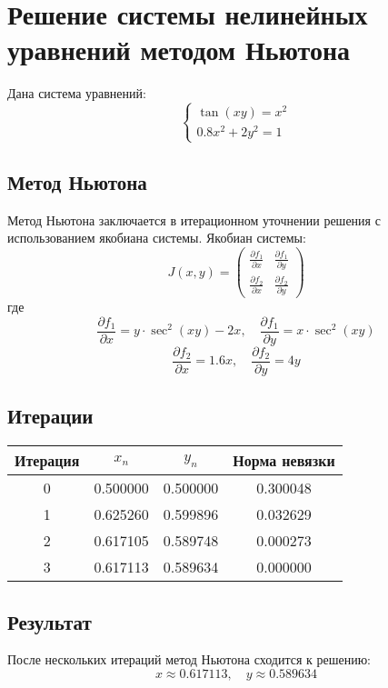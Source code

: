 \documentclass{article}
\begin{document}
\section*{Решение системы нелинейных уравнений методом Ньютона}

Дана система уравнений:
\[
\begin{cases}
\tan(xy) = x^2 \\
0.8x^2 + 2y^2 = 1
\end{cases}
\]

\subsection*{Метод Ньютона}

Метод Ньютона заключается в итерационном уточнении решения с использованием якобиана системы. Якобиан системы:
\[
J(x, y) = \begin{pmatrix}
\frac{\partial f_1}{\partial x} & \frac{\partial f_1}{\partial y} \\
\frac{\partial f_2}{\partial x} & \frac{\partial f_2}{\partial y}
\end{pmatrix}
\]
где
\[
\frac{\partial f_1}{\partial x} = y \cdot \sec^2(xy) - 2x, \quad
\frac{\partial f_1}{\partial y} = x \cdot \sec^2(xy)
\]
\[
\frac{\partial f_2}{\partial x} = 1.6x, \quad
\frac{\partial f_2}{\partial y} = 4y
\]

\subsection*{Итерации}

\begin{tabular}{|c|c|c|c|}
\hline
Итерация & \(x_n\) & \(y_n\) & Норма невязки \\
\hline
0 & 0.500000 & 0.500000 & 0.300048 \\
1 & 0.625260 & 0.599896 & 0.032629 \\
2 & 0.617105 & 0.589748 & 0.000273 \\
3 & 0.617113 & 0.589634 & 0.000000 \\

\hline
\end{tabular}

\subsection*{Результат}

После нескольких итераций метод Ньютона сходится к решению:
\[
x \approx 0.617113, \quad y \approx 0.589634
\]
\end{document}
